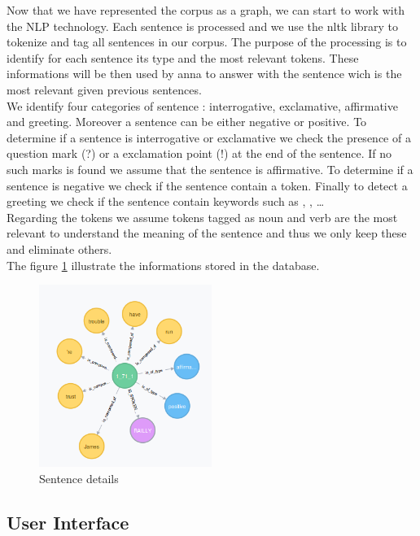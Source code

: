 Now that we have represented the corpus as a graph, we can start to work with the NLP technology. Each sentence is processed and we use the nltk library to tokenize and tag all sentences in our corpus. The purpose of the processing is to identify for each sentence its type and the most relevant tokens. These informations will be then used by anna to answer with the sentence wich is the most relevant given previous sentences.\\
We identify four categories of sentence : interrogative, exclamative, affirmative and greeting. Moreover a sentence can be either negative or positive. To determine if a sentence is interrogative or exclamative we check the presence of a question mark (?) or a exclamation point (!) at the end of the sentence. If no such marks is found we assume that the sentence is affirmative. To determine if a sentence is negative we check if the sentence contain a  token. Finally to detect a greeting we check if the sentence contain keywords such as , , \dots\\
Regarding the tokens we assume tokens tagged as noun and verb are the most relevant to understand the meaning of the sentence and thus we only keep these and eliminate others.\\
The figure \ref{fig:sent} illustrate the informations stored in the database.

\begin{figure}[!h]
\begin{center}
\includegraphics[width=0.5\textwidth]{./img/graph1711.png}
\end{center}
\caption{Sentence details}
\label{fig:sent}
\end{figure}

%
\subsection{User Interface}

